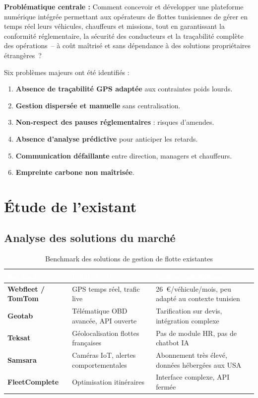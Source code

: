 \documentclass[12pt,a4paper]{report}
\newcommand{\thead}[1]{\cellcolor{tablehead}\textcolor{white}{\textbf{#1}}}
\begin{document}
\begin{tcolorbox}[keybox]
  \textbf{Problématique centrale :} Comment concevoir et développer une
  plateforme numérique intégrée permettant aux opérateurs de flottes
  tunisiennes de gérer en temps réel leurs véhicules, chauffeurs et missions,
  tout en garantissant la conformité réglementaire, la sécurité des conducteurs
  et la traçabilité complète des opérations~-- à coût maîtrisé et sans
  dépendance à des solutions propriétaires étrangères~?
\end{tcolorbox}

\medskip
Six problèmes majeurs ont été identifiés :

\begin{enumerate}
  \item \textbf{Absence de traçabilité GPS adaptée} aux contraintes poids lourds.
  \item \textbf{Gestion dispersée et manuelle} sans centralisation.
  \item \textbf{Non-respect des pauses réglementaires} : risques d'amendes.
  \item \textbf{Absence d'analyse prédictive} pour anticiper les retards.
  \item \textbf{Communication défaillante} entre direction, managers et chauffeurs.
  \item \textbf{Empreinte carbone non maîtrisée}.
\end{enumerate}

\section{Étude de l'existant}
\label{sec:ch1-existant}

\subsection{Analyse des solutions du marché}

\begin{table}[H]
  \centering
  \caption{Benchmark des solutions de gestion de flotte existantes}
  \label{tab:benchmark}
  \begin{tabularx}{\textwidth}{|l|Y|Y|}
    \hline
    \thead{Solution} & \thead{Points forts} & \thead{Limites principales} \\
    \hline
    \textbf{Webfleet / TomTom} &
      GPS temps réel, trafic live &
      26~€/véhicule/mois, peu adapté au contexte tunisien \\
    \textbf{Geotab} &
      Télématique OBD avancée, API ouverte &
      Tarification sur devis, intégration complexe \\
    \textbf{Teksat} &
      Géolocalisation flottes françaises &
      Pas de module HR, pas de chatbot IA \\
    \textbf{Samsara} &
      Caméras IoT, alertes comportementales &
      Abonnement très élevé, données hébergées aux USA \\
    \textbf{FleetComplete} &
      Optimisation itinéraires &
      Interface complexe, API fermée \\
    \hline
  \end{tabularx}
\end{table}
\end{document}
